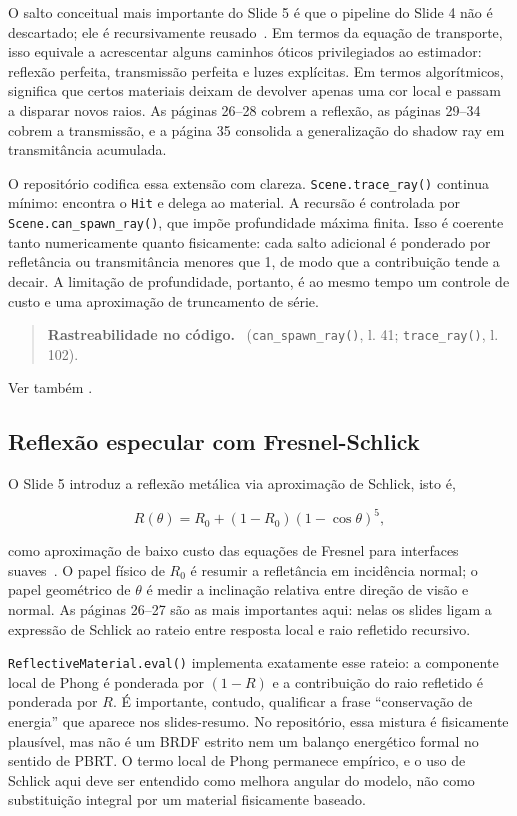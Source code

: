 \documentclass[portuguese]{sbcreviews-2025}%
\makeatletter
\newcommand{\slidescite}[2]{\citep[pp.~#2]{#1}}
\newcommand{\pbrtcontentsurl}{https://pbr-book.org/4ed/contents.html}
\newcommand{\pbrtsectionurl}[1]{%
    \ifcsdef{pbrturl@#1}{\csname pbrturl@#1\endcsname}{\pbrtcontentsurl}%
}
\newcommand{\pbrtsec}[1]{\citep[\href{\pbrtsectionurl{#1}}{Se\c{c}\~ao~#1}]{pharr2023pbrt}}
\newcommand{\traceability}[1]{%
    \begin{quote}
    \footnotesize\textbf{Rastreabilidade no c\'odigo.}~#1
    \end{quote}
}
\makeatother
\begin{document}
O salto conceitual mais importante do Slide 5 é que o pipeline do Slide 4 não é descartado; ele é recursivamente reusado~\slidescite{inf2608slides05}{26--35}. Em termos da equação de transporte, isso equivale a acrescentar alguns caminhos óticos privilegiados ao estimador: reflexão perfeita, transmissão perfeita e luzes explícitas. Em termos algorítmicos, significa que certos materiais deixam de devolver apenas uma cor local e passam a disparar novos raios. As páginas 26--28 cobrem a reflexão, as páginas 29--34 cobrem a transmissão, e a página 35 consolida a generalização do shadow ray em transmitância acumulada.

O repositório codifica essa extensão com clareza. \texttt{Scene.trace\_ray()} continua mínimo: encontra o \texttt{Hit} e delega ao material. A recursão é controlada por \texttt{Scene.can\_spawn\_ray()}, que impõe profundidade máxima finita. Isso é coerente tanto numericamente quanto fisicamente: cada salto adicional é ponderado por refletância ou transmitância menores que 1, de modo que a contribuição tende a decair. A limitação de profundidade, portanto, é ao mesmo tempo um controle de custo e uma aproximação de truncamento de série.

\traceability{ (\texttt{can\_spawn\_ray()}, l. 41; \texttt{trace\_ray()}, l. 102).}

Ver também \pbrtsec{1.2}.

\subsection{Reflexão especular com Fresnel-Schlick}
\label{sec:slide5-fresnel}

O Slide 5 introduz a reflexão metálica via aproximação de Schlick, isto é,

\[
R(\theta)=R_0 + (1-R_0)(1-\cos\theta)^5,
\]

como aproximação de baixo custo das equações de Fresnel para interfaces suaves~\slidescite{inf2608slides05}{26--28}. O papel físico de $R_0$ é resumir a refletância em incidência normal; o papel geométrico de $\theta$ é medir a inclinação relativa entre direção de visão e normal. As páginas 26--27 são as mais importantes aqui: nelas os slides ligam a expressão de Schlick ao rateio entre resposta local e raio refletido recursivo.

\texttt{ReflectiveMaterial.eval()} implementa exatamente esse rateio: a componente local de Phong é ponderada por $(1-R)$ e a contribuição do raio refletido é ponderada por $R$. É importante, contudo, qualificar a frase ``conservação de energia'' que aparece nos slides-resumo. No repositório, essa mistura é fisicamente plausível, mas não é um BRDF estrito nem um balanço energético formal no sentido de PBRT. O termo local de Phong permanece empírico, e o uso de Schlick aqui deve ser entendido como melhora angular do modelo, não como substituição integral por um material fisicamente baseado.
\end{document}
